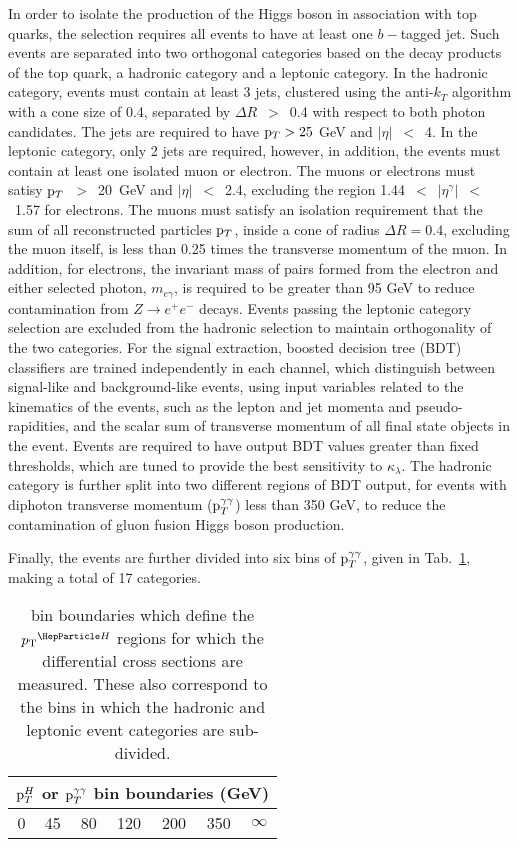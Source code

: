 In order to isolate the production of the Higgs boson in association with top quarks, the selection requires all events to have at least one $b-$tagged jet. Such events are separated into two orthogonal categories based on the decay products of the top quark, a hadronic category and a leptonic category. In the hadronic category, events must contain at least 3 jets, clustered using the anti-$k_{T}$ algorithm with a cone size of 0.4, separated by $\Delta R$~$>$~0.4 with respect to both photon candidates. The jets are required to have $\mathrm{p}_{T}>25$ GeV and $|\eta|$~$<$~4. In the leptonic category, only 2 jets are required, however, in addition, the events must contain at  least one isolated muon or electron. The muons or electrons must satisy $\mathrm{p}_{T}$~$>$~20~GeV and $|\eta|$~$<$~2.4, excluding the region 1.44~$<$~$|\eta^\gamma|$~$<$~1.57 for electrons. The muons must satisfy an isolation requirement that the sum of all reconstructed particles $\mathrm{p}_{T}$, inside a cone of radius $\Delta R=0.4$, excluding the muon itself, is less than 0.25 times the transverse momentum of the muon. In addition, for electrons, the invariant mass of pairs formed from the electron and either selected photon, $m_{e\gamma}$, is required to be greater than 95 GeV to reduce contamination from $Z\rightarrow e^{+}e^{-}$ decays. Events passing the leptonic category selection are excluded from the hadronic selection to maintain orthogonality of the two categories.  
For the signal extraction, boosted decision tree (BDT) classifiers are trained independently in each channel, which distinguish between signal-like and background-like events, using input variables related to the kinematics of the events, such as the lepton and jet momenta and pseudo-rapidities, and the scalar sum of transverse momentum of all final state objects in the event. Events are required to have output BDT values greater than fixed thresholds, which are tuned to provide the best sensitivity to $\kappa_{\lambda}$. The hadronic category is further split into two different regions of BDT output, for events with diphoton transverse momentum ($\mathrm{p}_{T}^{\gamma\gamma}$) less than 350 GeV, to reduce the contamination of gluon fusion Higgs boson production. 

Finally, the events are further divided into six bins of $\mathrm{p}_{T}^{\gamma\gamma}$, given in Tab.~\ref{tab:ttHdiff_CMS_ptbins}, making a total of 17 categories. 

\begin{table}[h]

 \centering
 \begin{tabular}{c|c|c|c|c|c|c}
    \hline
    \hline
    \multicolumn{7}{c}{$\mathrm{p}_{T}^{H}$ or $\mathrm{p}_{T}^{\gamma\gamma}$ bin boundaries (GeV)}  \\ \hline
    0 & 45 & 80 & 120 & 200 & 350 & $\infty$ \\
    \hline
    \hline
\end{tabular}
\caption{bin boundaries which define the $\pTH$ regions for which the differential cross sections are measured. These also correspond to the bins in which the hadronic and leptonic event categories are sub-divided.}
\label{tab:ttHdiff_CMS_ptbins}
\end{table}

